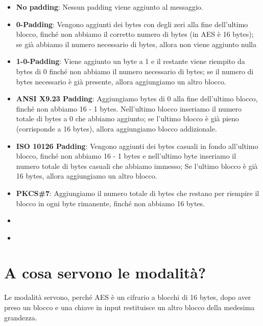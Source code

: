 \begin{itemize}
	\item \textsf{\small \textbf{No padding}: Nessun padding viene aggiunto al messaggio.}
	\item \textsf{\small \textbf{0-Padding}: Vengono aggiunti dei bytes con degli zeri alla fine dell'ultimo blocco, finché non abbiamo il corretto numero di bytes (in AES è 16 bytes); se già abbiamo il numero necessario di bytes, allora non viene aggiunto nulla}
	\item \textsf{\small \textbf{1-0-Padding}: Viene aggiunto un byte a 1 e il restante viene riempito da bytes di 0 finché non abbiamo il numero necessario di bytes; se il numero di bytes necessario è già presente, allora aggiungiamo un altro blocco.}
	\item \textsf{\small \textbf{ANSI X9.23 Padding}: Aggiungiamo bytes di 0 alla fine dell'ultimo blocco, finché non abbiamo 16 - 1 bytes. Nell'ultimo blocco inseriamo il numero totale di bytes a 0 che abbiamo aggiunto; se l'ultimo blocco è già pieno (corrisponde a 16 bytes), allora aggiungiamo blocco addizionale.}
	\item \textsf{\small \textbf{ISO 10126 Padding}: Vengono aggiunti dei bytes casuali in fondo all'ultimo blocco, finché non abbiamo 16 - 1 bytes e nell'ultimo byte inseriamo il numero totale di bytes casuali che abbiamo immesso; Se l'ultimo blocco è già 16 bytes, allora aggiungiamo un altro blocco.}
	\item \textsf{\small \textbf{PKCS\#7}: Aggiungiamo il numero totale di bytes che restano per riempire il blocco in ogni byte rimanente, finché non abbiamo 16 bytes.}
	\item \textsf{\small }
	\item \textsf{\small }
\end{itemize}


\section{A cosa servono le modalità?} %

\textsf{\small Le modalità servono, perché AES è un cifrario a blocchi di 16 bytes, dopo aver preso un blocco e una chiave in input restituisce un altro blocco della medesima grandezza.} %

